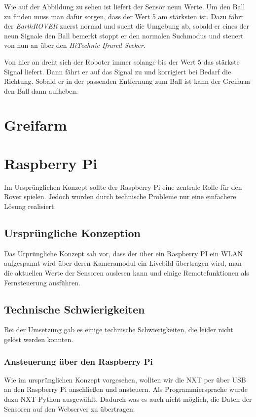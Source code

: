 Wie auf der Abbildung zu sehen ist liefert der Sensor neun Werte. Um den Ball zu finden muss man dafür sorgen, dass der Wert 5 am stärksten ist. Dazu fährt der \textit{EarthROVER} zuerst normal und sucht die Umgebung ab, sobald er eines der neun Signale den Ball bemerkt stoppt er den normalen Suchmodus und steuert von nun an über den \textit{HiTechnic Ifrared Seeker}.

Von hier an dreht sich der Roboter immer solange bis der Wert 5 das stärkste Signal liefert. Dann fährt er auf das Signal zu und korrigiert bei Bedarf die Richtung. Sobald er in der passenden Entfernung zum Ball ist kann der Greifarm den Ball dann aufheben.

\section{Greifarm}

\section{Raspberry Pi}

Im Ursprünglichen Konzept sollte der Raspberry Pi eine zentrale Rolle für den Rover spielen. Jedoch wurden durch technische Probleme nur eine einfachere Lösung realisiert.

\subsection{Ursprüngliche Konzeption} 

Das Urprüngliche Konzept sah vor, dass der über ein Raspberry PI ein WLAN aufgespannt wird über deren Kameramodul ein Livebild übertragen wird, man die aktuellen Werte der Sensoren auslesen kann und einige Remotefunktionen als Fernsteuerung ausführen.

\subsection{Technische Schwierigkeiten}

Bei der Umsetzung gab es einige technische Schwierigkeiten, die leider nicht gelöst werden konnten.

\subsubsection{Ansteuerung über den Raspberry Pi}

Wie im ursprünglichen Konzept vorgesehen, wollten wir die NXT per über USB an den Raspberry Pi anschließen und ansteuern. Als Programmiersprache wurde dazu NXT-Python ausgewählt. Dadurch was es auch nicht möglich, die Daten der Sensoren auf den Webserver zu übertragen.

